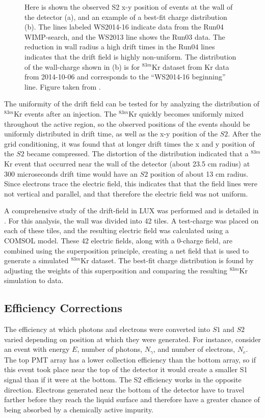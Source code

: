 \begin{figure}[!h]
\begin{subfigure}{0.5\linewidth}
\caption{}
\end{subfigure}
\caption{Here is shown the observed S2 x-y position of events at the wall of the detector (a), and an example of a best-fit charge distribution (b). The lines labeled WS2014-16 indicate data from the Run04 WIMP-search, and the WS2013 line shows the Run03 data. The reduction in wall radius a high drift times in the Run04 lines indicates that the drift field is highly non-uniform. The distribution of the wall-charge shown in (b) is for $^{83m}$Kr dataset from Kr data from 2014-10-06 and corresponds to the ``WS2014-16 beginning'' line. Figure taken from \cite{lux_efield}.}
\label{fig:lux_layout} 
\end{figure}

The uniformity of the drift field can be tested for by analyzing the distribution of $^{83m}$Kr events after an injection. The $^{83m}$Kr quickly becomes uniformly mixed throughout the active region, so the observed positions of the events should be uniformly distributed in drift time, as well as the x-y position of the $S2$. After the grid conditioning, it was found that at longer drift times the x and y position of the $S2$ became compressed. The distortion of the distribution indicated that a $^{83m}$Kr event that occurred near the wall of the detector (about 23.5 cm radius) at 300 microseconds drift time would have an $S2$ position of about 13 cm radius. Since electrons trace the electric field, this indicates that that the field lines were not vertical and parallel, and that therefore the electric field was not uniform.

A comprehensive study of the drift-field in LUX was performed and is detailed in \cite{lux_efield}. For this analysis, the wall was divided into 42 tiles. A test-charge was placed on each of these tiles, and the resulting electric field was calculated using a COMSOL model. These 42 electric fields, along with a 0-charge field, are combined using the superposition principle, creating a net field that is used to generate a simulated $^{83m}$Kr dataset. The best-fit charge distribution is found by adjusting the weights of this superposition and comparing the resulting $^{83m}$Kr simulation to data.
 
 \subsection{Efficiency Corrections}\label{sec:krypcal}
The efficiency at which photons and electrons were converted into $S1$ and $S2$ varied depending on position at which they were generated. For instance, consider an event with energy $E$, number of photons, $N_{\gamma}$, and number of electrons, $N_e$. The top PMT array has a lower collection efficiency than the bottom array, so if this event took place near the top of the detector it would create a smaller S1 signal than if it were at the bottom. The S2 efficiency works in the opposite direction. Electrons generated near the bottom of the detector have to travel farther before they reach the liquid surface and therefore have a greater chance of being absorbed by a chemically active impurity. 

